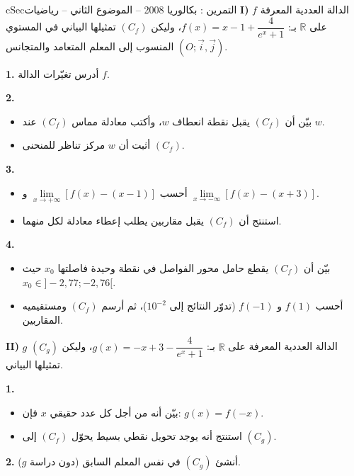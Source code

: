 \documentclass[12pt,a4paper]{article}
\newenvironment{BOX}[2]{\begin{otherlanguage}{english}\begin{arbox}{#1}{#2}}{\end{arbox}\end{otherlanguage}}
\newcounter{exo}
\newenvironment{tamrin}[1]{\stepcounter{exo}\begin{BOX}{cSec}{التمرين \theexo: #1}}{\end{BOX}}
\newcommand{\R}{\mathbb{R}}
\newenvironment{sq}{\begin{itemize}[leftmargin=2.4em,itemsep=3pt]}{\end{itemize}}
\newcommand{\qa}{\item[(أ)]}\newcommand{\qb}{\item[(ب)]}\newcommand{\qc}{\item[(جـ)]}\newcommand{\qd}{\item[(د)]}\newcommand{\qe}{\item[(هـ)]}
\newcommand{\QQ}[1]{\par\smallskip\textbf{#1.} }
\begin{document}
\begin{tamrin}{بكالوريا 2008 -- الموضوع الثاني -- رياضيات}
\textbf{I)} $f$ الدالة العددية المعرفة على $\R$ بـ: $f(x)=x-1+\dfrac{4}{e^{x}+1}$،
وليكن $(C_f)$ تمثيلها البياني في المستوي المنسوب إلى المعلم المتعامد والمتجانس $(O;\vec i,\vec j)$.
\QQ{1} أدرس تغيّرات الدالة $f$.
\QQ{2}
\begin{sq}
\qa بيّن أن $(C_f)$ يقبل نقطة انعطاف $w$، وأكتب معادلة مماس $(C_f)$ عند $w$.
\qb أثبت أن $w$ مركز تناظر للمنحنى $(C_f)$.
\end{sq}
\QQ{3}
\begin{sq}
\qa أحسب $\lim\limits_{x\to+\infty}\left[f(x)-(x-1)\right]$ و $\lim\limits_{x\to-\infty}\left[f(x)-(x+3)\right]$.
\qb استنتج أن $(C_f)$ يقبل مقاربين يطلب إعطاء معادلة لكل منهما.
\end{sq}
\QQ{4}
\begin{sq}
\qa بيّن أن $(C_f)$ يقطع حامل محور الفواصل في نقطة وحيدة فاصلتها $x_0$ حيث $x_0\in]-2{,}77;-2{,}76[$.
\qb أحسب $f(1)$ و $f(-1)$ (تدوّر النتائج إلى $10^{-2}$)، ثم أرسم $(C_f)$ ومستقيميه المقاربين.
\end{sq}

\textbf{II)} $g$ الدالة العددية المعرفة على $\R$ بـ: $g(x)=-x+3-\dfrac{4}{e^{x}+1}$، وليكن $(C_g)$ تمثيلها البياني.
\QQ{1}
\begin{sq}
\qa بيّن أنه من أجل كل عدد حقيقي $x$ فإن: $g(x)=f(-x)$.
\qb استنتج أنه يوجد تحويل نقطي بسيط يحوّل $(C_f)$ إلى $(C_g)$.
\end{sq}
\QQ{2} أنشئ $(C_g)$ في نفس المعلم السابق (دون دراسة $g$).
\end{tamrin}
\end{document}
